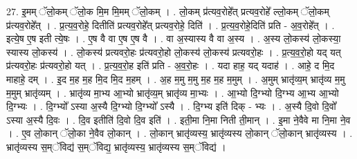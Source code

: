 \documentclass[17pt]{extarticle}
\begin{document}
27. इ॒मम् ॅलो॒कम् ॅलो॒क मि॒म मि॒मम् ॅलो॒कम् । . लो॒कम् प्र॑त्यव॒रोहे᳚त् प्रत्यव॒रोहे᳚ ल्लो॒कम् ॅलो॒कम् प्र॑त्यव॒रोहे᳚त् । . प्र॒त्य॒व॒रोहे॒ दितीति॑ प्रत्यव॒रोहे᳚त् प्रत्यव॒रोहे॒ दिति॑ । . प्र॒त्य॒व॒रोहे॒दिति॑ प्रति - अ॒व॒रोहे᳚त् । . इत्ये॒ष ए॒ष इती त्ये॒षः । . ए॒ष वै वा ए॒ष ए॒ष वै । . वा अ॒स्यास्य वै वा अ॒स्य । . अ॒स्य लो॒कस्य॑ लो॒कस्या॒ स्यास्य लो॒कस्य॑ । . लो॒कस्य॑ प्रत्यवरो॒हः प्र॑त्यवरो॒हो लो॒कस्य॑ लो॒कस्य॑ प्रत्यवरो॒हः । . प्र॒त्य॒व॒रो॒हो यद् यत् प्र॑त्यवरो॒हः प्र॑त्यवरो॒हो यत् । . प्र॒त्य॒व॒रो॒ह इति॑ प्रति - अ॒व॒रो॒हः । . यदा हाह॒ यद् यदाह॑ । . आहे॒ द मि॒द माहाहे॒ दम् । . इ॒द म॒ह म॒ह मि॒द मि॒द म॒हम् । . अ॒ह म॒मु म॒मु म॒ह म॒ह म॒मुम् । . अ॒मुम् भ्रातृ॑व्य॒म् भ्रातृ॑व्य म॒मु म॒मुम् भ्रातृ॑व्यम् । . भ्रातृ॑व्य मा॒भ्य आ॒भ्यो भ्रातृ॑व्य॒म् भ्रातृ॑व्य मा॒भ्यः । . आ॒भ्यो दि॒ग्भ्यो दि॒ग्भ्य आ॒भ्य आ॒भ्यो दि॒ग्भ्यः । . दि॒ग्भ्यो᳚ ऽस्या अ॒स्यै दि॒ग्भ्यो दि॒ग्भ्यो᳚ ऽस्यै । . दि॒ग्भ्य इति॑ दिक् - भ्यः । . अ॒स्यै दि॒वो दि॒वो᳚ ऽस्या अ॒स्यै दि॒वः । . दि॒व इतीति॑ दि॒वो दि॒व इति॑ । . इती॒मा नि॒मा निती ती॒मान् । . इ॒मा ने॒वैवे मा नि॒मा ने॒व । . ए॒व लो॒कान् ॅलो॒का ने॒वैव लो॒कान् । . लो॒कान् भ्रातृ॑व्यस्य॒ भ्रातृ॑व्यस्य लो॒कान् ॅलो॒कान् भ्रातृ॑व्यस्य । . भ्रातृ॑व्यस्य स॒म्ॅविद्य॑ स॒म्ॅविद्य॒ भ्रातृ॑व्यस्य॒ भ्रातृ॑व्यस्य स॒म्ॅविद्य॑ । \newline
\end{document}
